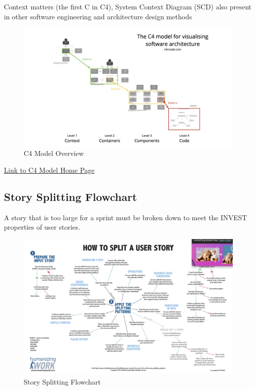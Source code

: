 \documentclass[../Main.tex]{subfiles}
\begin{document}
Context matters (the first C in C4), System Context Diagram (SCD) also present in other software engineering and architecture design methods

\begin{figure}[H]
    \centering
    \includegraphics[]{Images/c4-overview.png}
    \caption{C4 Model Overview}
\end{figure}
\href{https://c4model.com/}{Link to C4 Model Home Page}

\newpage

\subsection{Story Splitting Flowchart}
A story that is too large for a sprint must be broken down
to meet the INVEST properties of user stories.
\begin{figure}[H]
    \centering
    \includegraphics[angle=90,height=1\textwidth]{Images/storysplitting.png}
    \caption{Story Splitting Flowchart}
\end{figure}
\newpage
\end{document}
